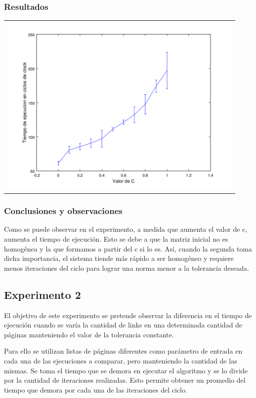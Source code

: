 		\subsubsection*{Resultados}
			{\centering \begin{tabular}{c}
		      \includegraphics[width=12cm]{../../src/exp/graficos/exp1.png} \\
		    \end{tabular}}

		\subsubsection*{Conclusiones y observaciones} 
		Como se puede observar en el experimento, a medida que aumenta el valor de c, aumenta el tiempo de ejecución. Esto se debe a que la matriz inicial no es homogénea y la que formamos a partir del c si lo es. Así, cuando la segunda toma dicha importancia, el sistema tiende más rápido a ser homogéneo y requiere menos iteraciones del ciclo para lograr una norma menor a la tolerancia deseada. 



	\subsection{Experimento 2}
	El objetivo de este experimento se pretende observar la diferencia en el tiempo de ejecución cuando se varía la cantidad de links en una determinada cantidad de páginas manteniendo el valor de la tolerancia constante.

	Para ello se utilizan listas de páginas diferentes como parámetro de entrada en cada una de las ejecuciones a comparar, pero manteniendo la cantidad de las mismas. Se toma el tiempo que se demora en ejecutar el algoritmo y se lo divide por la cantidad de iteraciones realizadas. Esto permite obtener un promedio del tiempo que demora por cada una de las iteraciones del ciclo. 
	


